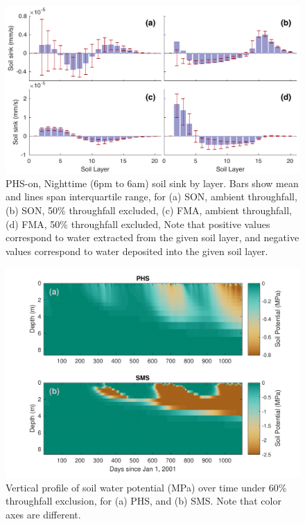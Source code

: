 \documentclass[draft,linenumbers]{agujournal}
\begin{document}
    \clearpage
    \begin{figure}[h]
     \centering
     \includegraphics[width=30pc]{../figs/fig10.pdf}
     \caption{PHS-on, Nighttime (6pm to 6am)  soil sink by layer.
          Bars show mean and lines span interquartile range, for 
     (a) SON, ambient throughfall,
     (b) SON, 50\% throughfall excluded,
     (c) FMA, ambient throughfall,
     (d) FMA, 50\% throughfall excluded,
     Note that positive values correspond to water extracted from the given soil layer, 
     and negative values correspond to water deposited into the given soil layer.}
     \label{fig10}
  \end{figure}
  
      \clearpage
    \begin{figure}[h]
     \centering
     \includegraphics[width=30pc]{../figs2/fig11.pdf}
     \caption{Vertical profile of soil water potential (MPa) over time under 60\% throughfall exclusion, for
     (a) PHS, and 
     (b) SMS.
     Note that color axes are different. }
     \label{fig11}
  \end{figure}
  
\end{document}
